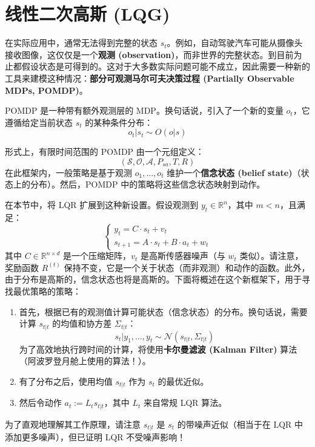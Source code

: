 \section{线性二次高斯 (LQG)}

在实际应用中，通常无法得到完整的状态 $s_t$。例如，自动驾驶汽车可能从摄像头接收图像，这仅仅是一个\textbf{观测 (observation)}，而非世界的完整状态。到目前为止都假设状态是可得到的。这对于大多数实际问题可能不成立，因此需要一种新的工具来建模这种情况：\textbf{部分可观测马尔可夫决策过程 (Partially Observable MDPs, POMDP)}。

POMDP 是一种带有额外观测层的 MDP。换句话说，引入了一个新的变量 $o_t$，它遵循给定当前状态 $s_t$ 的某种条件分布：
\[
    o_t|s_t \sim O(o|s)
\]

形式上，有限时间范围的 POMDP 由一个元组定义：
\[
    (\mathcal{S}, \mathcal{O}, \mathcal{A}, P_{sa}, T, R)
\]
在此框架内，一般策略是基于观测 $o_1, \dots, o_t$ 维护一个\textbf{信念状态 (belief state)}（状态上的分布）。然后，POMDP 中的策略将这些信念状态映射到动作。

在本节中，将 LQR 扩展到这种新设置。假设观测到 $y_t \in \mathbb{R}^n$，其中 $m < n$，且满足：
\[
    \begin{cases}
        y_t = C \cdot s_t + v_t \\
        s_{t+1} = A \cdot s_t + B \cdot a_t + w_t
    \end{cases}
\]
其中 $C \in \mathbb{R}^{n \times d}$ 是一个压缩矩阵，$v_t$ 是高斯传感器噪声（与 $w_t$ 类似）。请注意，奖励函数 $R^{(t)}$ 保持不变，它是一个关于状态（而非观测）和动作的函数。此外，由于分布是高斯的，信念状态也将是高斯的。下面将概述在这个新框架下，用于寻找最优策略的策略：

\begin{enumerate}[label=\textbf{步骤 \arabic*}]
    \item 首先，根据已有的观测值计算可能状态（信念状态）的分布。换句话说，需要计算 $s_{t|t}$ 的均值和协方差 $\Sigma_{t|t}$：
    \[
        s_t|y_1, \dots, y_t \sim \mathcal{N}(s_{t|t}, \Sigma_{t|t})
    \]
    为了高效地执行跨时间的计算，将使用\textbf{卡尔曼滤波 (Kalman Filter)} 算法（阿波罗登月舱上使用的算法！）。

    \item 有了分布之后，使用均值 $s_{t|t}$ 作为 $s_t$ 的最优近似。
    \item 然后令动作 $a_t := L_t s_{t|t}$，其中 $L_t$ 来自常规 LQR 算法。
\end{enumerate}

为了直观地理解其工作原理，请注意 $s_{t|t}$ 是 $s_t$ 的带噪声近似（相当于在 LQR 中添加更多噪声），但已证明 LQR 不受噪声影响！

